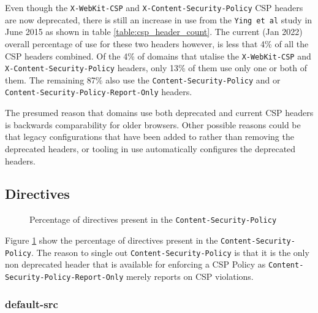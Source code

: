\documentclass{mscreport}
\begin{document}
\vspace{0.3cm} \noindent
Even though the \texttt{X-WebKit-CSP} and \texttt{X-Content-Security-Policy} CSP headers are now deprecated, there is still an increase in use from the \texttt{Ying et al} study \cite{Ying2016-ag} in June 2015 as shown in table \ref{table:csp_header_count}. The current (Jan 2022) overall percentage of use for these two headers however, is less that 4\% of all the CSP headers combined. Of the 4\% of domains that utalise the \texttt{X-WebKit-CSP} and \texttt{X-Content-Security-Policy} headers, only 13\% of them use only one or both of them. The remaining 87\% also use the \texttt{Content-Security-Policy} and or \texttt{Content-Security-Policy-Report-Only} headers.


\vspace{0.3cm} \noindent
The presumed reason that domains use both deprecated and current CSP headers is backwards comparability for older browsers. Other possible reasons could be that legacy configurations that have been added to rather than removing the deprecated headers, or tooling in use automatically configures the deprecated headers.

\clearpage
\newpage

\subsection{Directives}

\begin{figure}[H]
	\begin{center}
		\caption{Percentage of directives present in the \texttt{Content-Security-Policy}}
		\label{fig:csp_csp_by_directives}
	\end{center}
\end{figure}

Figure \ref{fig:csp_csp_by_directives} show the percentage of directives present in the \texttt{Content-Security-Policy}. The reason to single out \texttt{Content-Security-Policy} is that it is the only non deprecated header that is available for enforcing a CSP Policy as \texttt{Content-Security-Policy-Report-Only} merely reports on CSP violations.

\subsubsection{default-src}
\end{document}

